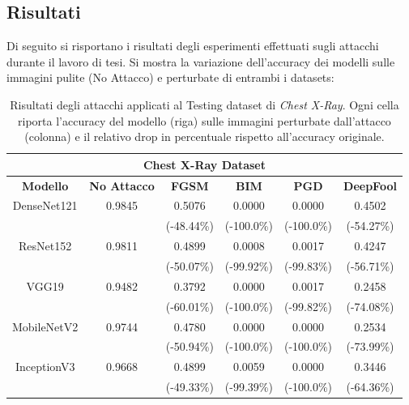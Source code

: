     \subsection{Risultati}
    Di seguito si risportano i risultati degli esperimenti effettuati sugli attacchi durante il lavoro di tesi.
    Si mostra la variazione dell'accuracy dei modelli sulle immagini pulite (No Attacco) e perturbate di entrambi i datasets:
        \begin{table}[!h]
            \centering
            \begin{tabular}{|c||c||c|c|c|c|}
                \hline
                \multicolumn{6}{|c|}{\textbf{Chest X-Ray Dataset}} \rule[-3mm]{0mm}{8mm}\\
                \hline \hline
                \rule[-3mm]{0mm}{8mm}
                \textbf{Modello} & \textbf{No Attacco} & \textbf{FGSM} & \textbf{BIM} & \textbf{PGD} & \textbf{DeepFool} \\
                \hline \hline
                \rule[-3mm]{0mm}{8mm}
                DenseNet121 & 0.9845 & 0.5076  & 0.0000  & 0.0000 & 0.4502\\
                    &  & (-48.44\%) & (-100.0\%) & (-100.0\%) & (-54.27\%)\\
                \hline
                \rule[-3mm]{0mm}{8mm}
                ResNet152   & 0.9811 & 0.4899 & 0.0008 & 0.0017  & 0.4247\\
                    &  & (-50.07\%) & (-99.92\%) & (-99.83\%) & (-56.71\%)\\
                \hline
                \rule[-3mm]{0mm}{8mm}
                VGG19       & 0.9482 & 0.3792  & 0.0000 & 0.0017 & 0.2458\\
                    &  & (-60.01\%) & (-100.0\%) & (-99.82\%) & (-74.08\%)\\
                \hline
                \rule[-3mm]{0mm}{8mm}
                MobileNetV2 & 0.9744 & 0.4780 & 0.0000 & 0.0000 & 0.2534\\
                    &  & (-50.94\%) & (-100.0\%) & (-100.0\%) & (-73.99\%)\\
                \hline
                \rule[-3mm]{0mm}{8mm}
                InceptionV3 & 0.9668 & 0.4899 & 0.0059 & 0.0000 & 0.3446\\
                    &  & (-49.33\%) & (-99.39\%) & (-100.0\%) & (-64.36\%)\\
                \hline
            \end{tabular}
            \caption{Risultati degli attacchi applicati al Testing dataset di \textit{Chest X-Ray}. Ogni cella riporta l'accuracy del modello (riga) sulle immagini perturbate dall'attacco (colonna) e il relativo drop in percentuale rispetto all'accuracy originale.}
            \label{Attacks Results Chest X-Ray}
        \end{table}
        
